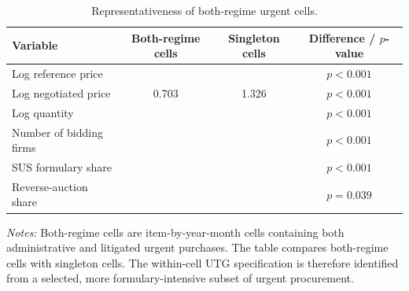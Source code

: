 \begin{table}[ht]
\centering
\caption{Representativeness of both-regime urgent cells.}
\label{tab:both_types_cells}
\begin{threeparttable}
\begin{tabular}{lccc}
\toprule
Variable & Both-regime cells & Singleton cells & Difference / $p$-value \\
\midrule
Log reference price & \BPbothCellMeanLogRefBoth{} & \BPbothCellMeanLogRefSingle{} & $p<0.001$ \\
Log negotiated price & 0.703 & 1.326 & $p<0.001$ \\
Log quantity & \BPbothCellMeanLogQtyBoth{} & \BPbothCellMeanLogQtySingle{} & $p<0.001$ \\
Number of bidding firms & \BPbothCellMeanFirmsBoth{} & \BPbothCellMeanFirmsSingle{} & $p<0.001$ \\
SUS formulary share & \BPbothCellSusShareBoth{} & \BPbothCellSusShareSingle{} & $p<0.001$ \\
Reverse-auction share & \BPbothCellModalityShareBoth{} & \BPbothCellModalityShareSingle{} & $p=0.039$ \\
\bottomrule
\end{tabular}
\begin{tablenotes}[flushleft]\footnotesize
\item \textit{Notes:} Both-regime cells are item-by-year-month cells containing both administrative and litigated urgent purchases. The table compares \BPbothCellN{} both-regime cells with \BPbothCellNSingleton{} singleton cells. The within-cell UTG specification is therefore identified from a selected, more formulary-intensive subset of urgent procurement.
\end{tablenotes}
\end{threeparttable}
\end{table}
